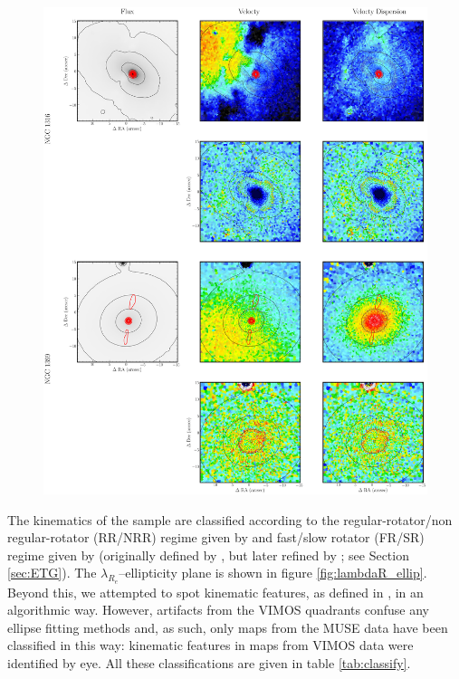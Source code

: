 		\begin{figure}
			\centering
			\includegraphics[height=0.62\textheight]{chapter4/muse/kin2.png}
		\end{figure}

		
		The kinematics of the sample are classified according to the regular-rotator/non regular-rotator (RR/NRR) regime given by \citet{Krajnovic2011} and fast/slow rotator (FR/SR) regime given by \citet{Cappellari2016} (originally defined by \citealt{Emsellem2011}, but later refined by \citealt{Cappellari2016}; see Section \ref{sec:ETG}). The $\lambda_{R_e}$--ellipticity plane is shown in figure \ref{fig:lambdaR_ellip}. Beyond this, we attempted to spot kinematic features, as defined in \citet{Krajnovic2011}, in an algorithmic way. However, artifacts from the VIMOS quadrants confuse any ellipse fitting methods and, as such, only maps from the MUSE data have been classified in this way: kinematic features in maps from VIMOS data were identified by eye. All these classifications are given in table \ref{tab:classify}. 


